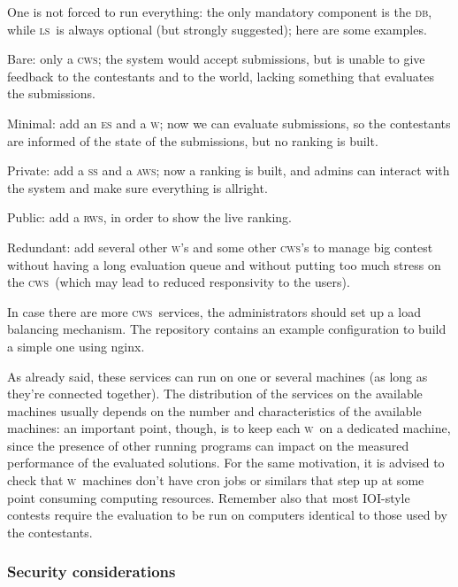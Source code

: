\documentclass[a4paper,8pt]{amsart}
\newcommand{\DB}{\textsc{db}}
\newcommand{\LS}{\textsc{ls}}
\newcommand{\ES}{\textsc{es}}
\newcommand{\WS}{\textsc{w}}
\renewcommand{\SS}{\textsc{ss}}
\newcommand{\CWS}{\textsc{cws}}
\newcommand{\AWS}{\textsc{aws}}
\newcommand{\RWS}{\textsc{rws}}
\newenvironment{squishlist}{%
  \begin{list}{\textbullet}%
    { \setlength{\itemsep}{0pt}%
      \setlength{\parsep}{3pt}%
      \setlength{\topsep}{3pt}%
      \setlength{\partopsep}{0pt}%
      \setlength{\leftmargin}{1.5em}%
      \setlength{\labelwidth}{1em}%
      \setlength{\labelsep}{0.5em} }%
}{\end{list}}
\begin{document}
\begin{multicols}{2}
  One is not forced to run everything: the only mandatory component is
  the \DB, while \LS\ is always optional (but strongly suggested);
  here are some examples.
  \begin{squishlist}
  \item Bare: only a \CWS{}; the system would accept submissions, but
    is unable to give feedback to the contestants and to the world,
    lacking something that evaluates the submissions.
  \item Minimal: add an \ES{} and a \WS{}; now we can evaluate
    submissions, so the contestants are informed of the state of the
    submissions, but no ranking is built.
  \item Private: add a \SS{} and a \AWS{}; now a ranking is built, and
    admins can interact with the system and make sure everything is
    allright.
  \item Public: add a \RWS{}, in order to show the live ranking.
  \item Redundant: add several other \WS{}'s and some other \CWS{}'s
    to manage big contest without having a long evaluation queue and
    without putting too much stress on the \CWS\ (which may lead to
    reduced responsivity to the users).
  \end{squishlist}

  In case there are more \CWS\ services, the administrators should set
  up a load balancing mechanism. The repository contains an example
  configuration to build a simple one using nginx.

  As already said, these services can run on one or several machines
  (as long as they're connected together). The distribution of the
  services on the available machines usually depends on the number and
  characteristics of the available machines: an important point,
  though, is to keep each \WS\ on a dedicated machine, since the
  presence of other running programs can impact on the measured
  performance of the evaluated solutions. For the same motivation, it
  is advised to check that \WS\ machines don't have cron jobs or
  similars that step up at some point consuming computing
  resources. Remember also that most IOI-style contests require the
  evaluation to be run on computers identical to those used by the
  contestants.

  \subsubsection{Security considerations}


\end{multicols}
\end{document}
